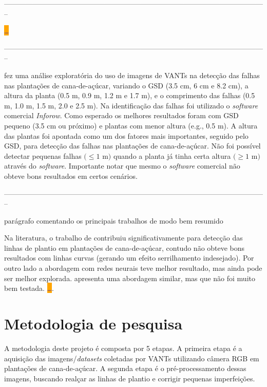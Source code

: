 \documentclass[12pt, a4paper, english, brazil]{article}
\newcommand{\textRed}[1]{{{\color{red} #1}}}
\newcommand{\dotsBlue}{\colorbox{orange}{\textcolor{blue}{\dots}}}
\newcommand{\linePage}{--------------------------------------------------------------------------------------------------------------}
\begin{document}
\linePage

 \dotsBlue

\linePage

 fez uma análise exploratória do uso de imagens de VANTs na detecção das falhas nas plantações de cana-de-açúcar, variando o GSD (3.5 cm, 6 cm e 8.2 cm), a altura da planta (0.5 m, 0.9 m, 1.2 m e 1.7 m), e o comprimento das falhas (0.5 m, 1.0 m, 1.5 m, 2.0 e 2.5 m). Na identificação das falhas foi utilizado o \textit{software} comercial \textit{Inforow}. Como esperado os melhores resultados foram com GSD pequeno (3.5 cm ou próximo) e plantas com menor altura (e.g., 0.5 m). A altura das plantas foi apontada como um dos fatores mais importantes, seguido pelo GSD, para detecção das falhas nas plantações de cana-de-açúcar. Não foi possível detectar pequenas falhas $(\le 1$ m$)$ quando a planta já tinha certa altura $(\ge 1$ m$)$ através do \textit{software}. Importante notar que mesmo o \textit{software} comercial não obteve bons resultados em certos cenários.

\linePage

\textRed{parágrafo comentando os principais trabalhos de modo bem resumido}

Na literatura, o trabalho de  contribuiu significativamente para detecção das linhas de plantio em plantações de cana-de-açúcar, contudo não obteve bons resultados com linhas curvas (gerando um efeito serrilhamento indesejado). Por outro lado a abordagem com redes neurais teve melhor resultado, mas ainda pode ser melhor explorada.  apresenta uma abordagem similar, mas que não foi muito bem testada.  \dotsBlue.


\section{Metodologia de pesquisa}

A metodologia deste projeto é composta por 5 etapas. A primeira etapa é a aquisição das imagens/\textit{datasets} coletadas por VANTs utilizando câmera RGB em plantações de cana-de-açúcar. A segunda etapa é o pré-processamento dessas imagens, buscando realçar as linhas de plantio e corrigir pequenas imperfeições.
\end{document}
